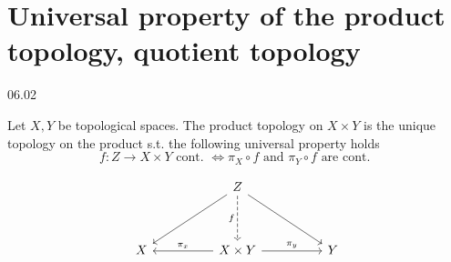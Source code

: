 \section{Universal property of the product topology, quotient topology}
06.02

\begin{theorem}
   Let \( X, Y \) be topological spaces.
   The product topology on \( X \times Y \) is the unique topology
   on the product s.t. the following universal property holds
  \begin{equation}
    \label{eq:prod}
    f: Z \to X \times Y \text{ cont. } \iff \pi_X \circ f \text{ and } \pi_Y \circ f \text{ are cont. }
  \end{equation}
\end{theorem}

\[\begin{tikzcd}
	&& Z \\
	\\
	X && {X \times Y} && Y
	\arrow[from=1-3, to=3-1]
	\arrow["f"', dashed, from=1-3, to=3-3]
	\arrow[from=1-3, to=3-5]
	\arrow["{\pi_x}"', from=3-3, to=3-1]
	\arrow["{\pi_y}", from=3-3, to=3-5]
\end{tikzcd}\]


